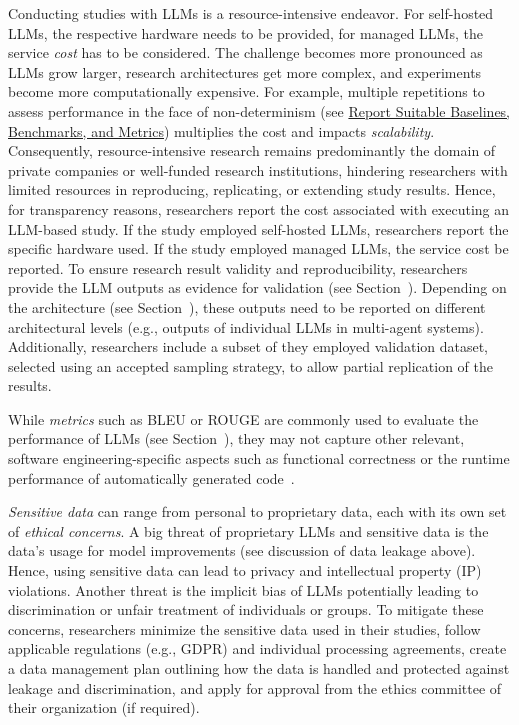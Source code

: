 Conducting studies with LLMs is a resource-intensive endeavor.
For self-hosted LLMs, the respective hardware needs to be provided, for managed LLMs, the service \emph{cost} has to be considered.
The challenge becomes more pronounced as LLMs grow larger, research architectures get more complex, and experiments become more computationally expensive.
For example, multiple repetitions to assess performance in the face of non-determinism (see \href{/guidelines/report-baselines-benchmarks-and-metrics}{Report Suitable Baselines, Benchmarks, and Metrics}) multiplies the cost and impacts \emph{scalability}.
Consequently, resource-intensive research remains predominantly the domain of private companies or well-funded research institutions, hindering researchers with limited resources in reproducing, replicating, or extending study results.
Hence, for transparency reasons, researchers \should report the cost associated with executing an LLM-based study. 
If the study employed self-hosted LLMs, researchers \should report the specific hardware used. 
If the study employed managed LLMs, the service cost \should be reported.
To ensure research result validity and reproducibility, researchers \must provide the LLM outputs as evidence for validation (see Section~\prompts).
Depending on the architecture (see Section~\toolarchitecture), these outputs need to be reported on different architectural levels (e.g., outputs of individual LLMs in multi-agent systems).
Additionally, researchers \should include a subset of they employed validation dataset, selected using an accepted sampling strategy, to allow partial replication of the results.

While \emph{metrics} such as BLEU or ROUGE are commonly used to evaluate the performance of LLMs (see Section~\benchmarksmetrics), they may not capture other relevant, software engineering-specific aspects such as functional correctness or the runtime performance of automatically generated code~\cite{DBLP:conf/nips/LiuXW023}.

\emph{Sensitive data} can range from personal to proprietary data, each with its own set of \emph{ethical concerns}.
A big threat of proprietary LLMs and sensitive data is the data's usage for model improvements (see discussion of data leakage above).
Hence, using sensitive data can lead to privacy and intellectual property (IP) violations.
Another threat is the implicit bias of LLMs potentially leading to discrimination or unfair treatment of individuals or groups.
To mitigate these concerns, researchers \should minimize the sensitive data used in their studies, \must follow applicable regulations (e.g., GDPR) and individual processing agreements, \should create a data management plan outlining how the data is handled and protected against leakage and discrimination, and \must apply for approval from the ethics committee of their organization (if required).

